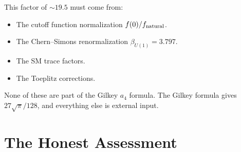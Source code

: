 \documentclass[12pt,a4paper]{article}
\theoremstyle{definition}
\begin{document}
This factor of $\sim 19.5$ must come from:
\begin{itemize}
\item The cutoff function normalization $f(0)/f_{\rm natural}$.
\item The Chern--Simons renormalization $\beta_{U(1)} = 3.797$.
\item The SM trace factors.
\item The Toeplitz corrections.
\end{itemize}

None of these are part of the Gilkey $a_4$ formula.  The Gilkey
formula gives $27\sqrt{\pi}/128$, and everything else is external
input.

\section{The Honest Assessment}
\label{sec:honest}
\end{document}
